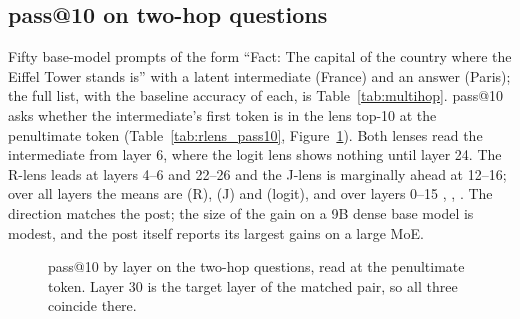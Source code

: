 \documentclass[11pt]{article}
\begin{document}
\subsection{pass@10 on two-hop questions}
Fifty base-model prompts of the form ``Fact: The capital of the country where the Eiffel Tower stands is'' with a latent intermediate (France) and an answer (Paris); the full list, with the baseline accuracy of each, is Table~\ref{tab:multihop}. pass@10 asks whether the intermediate's first token is in the lens top-10 at the penultimate token (Table~\ref{tab:rlens_pass10}, Figure~\ref{fig:pass10}). Both lenses read the intermediate from layer 6, where the logit lens shows nothing until layer 24. The R-lens leads at layers 4--6 and 22--26 and the J-lens is marginally ahead at 12--16; over all layers the means are \PtenMeanrlens{} (R), \PtenMeanjlens{} (J) and \PtenMeanlogit{} (logit), and over layers 0--15 \PtenEarlyrlens{}, \PtenEarlyjlens{}, \PtenEarlylogit{}. The direction matches the post; the size of the gain on a 9B dense base model is modest, and the post itself reports its largest gains on a large MoE.



\begin{figure}[t]
\centering
{}
\caption{pass@10 by layer on the \ATnQ{} two-hop questions, read at the penultimate token. Layer 30 is the target layer of the matched pair, so all three coincide there.}
\label{fig:pass10}
\end{figure}
\end{document}
